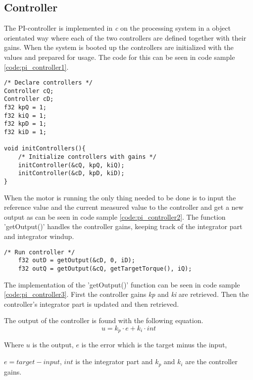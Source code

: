 \subsection{Controller}

The PI-controller is implemented in \textit{c} on the processing system in a object orientated way where each of the two controllers are defined together with their gains. When the system is booted up the controllers are initialized with the values and prepared for usage. The code for this can be seen in code sample \ref{code:pi_controller1}.

\begin{lstlisting}[style=c, caption=Initialization of PI-controller., label=code:pi_controller1]
/* Declare controllers */
Controller cQ;
Controller cD;
f32 kpQ = 1;
f32 kiQ = 1;
f32 kpD = 1;
f32 kiD = 1;

void initControllers(){
    /* Initialize controllers with gains */
    initController(&cQ, kpQ, kiQ);
    initController(&cD, kpD, kiD);
}
\end{lstlisting}

When the motor is running the only thing needed to be done is to input the reference value and the current measured value to the controller and get a new output as can be seen in code sample \ref{code:pi_controller2}. The function 'getOutput()' handles the controller gains, keeping track of the integrator part and integrator windup.

\begin{lstlisting}[style=c, caption=Usage of PI-controller., label=code:pi_controller2]
    /* Run controller */
	f32 outD = getOutput(&cD, 0, iD);
	f32 outQ = getOutput(&cQ, getTargetTorque(), iQ);
\end{lstlisting}

The implementation of the 'getOutput()' function can be seen in code sample \ref{code:pi_controller3}.
First the controller gains \textit{kp} and \textit{ki} are retrieved. Then the controller's integrator part is updated and then retrieved.

The output of the controller is found with the following equation.
\begin{equation}
    u = k_p \cdot e + k_i \cdot int
\end{equation}

Where $u$ is the output, $e$ is the error which is the target minus the input, 

$e = target - input$, $int$ is the integrator part and $k_p$ and $k_i$ are the controller gains.

